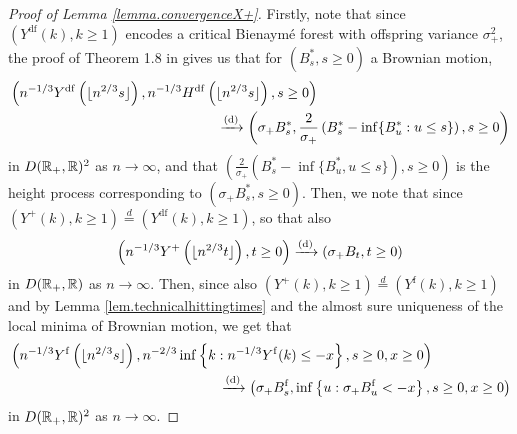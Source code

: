 \begin{proof}[Proof of Lemma \ref{lemma.convergenceX+}]
Firstly, note that since $(Y^{\mathrm{df}}(k),k\geq 1)$ encodes a critical Bienaym\'e forest with offspring variance $\sigma_+^2$, the proof of Theorem 1.8 in \citet{legallRandomTreesApplications2005} gives us that for $(B^*_s,s\geq 0)$ a Brownian motion,
\begin{align}\label{eq.convergenceX}
&\left(n^{-1/3}Y^{\mathrm{df}}\left(\lfloor n^{2/3}s\rfloor \right), n^{-1/3}H^{\mathrm{df}}\left(\lfloor n^{2/3}s\rfloor \right), s\geq 0 \right) \nonumber \\
& \hspace{15em} \todist \left(\sigma_+ B^*_s,\frac{2}{\sigma_+} \left(B^*_s-\inf\{B^*_u:u\leq s\}\right),  s\geq 0\right)
\end{align} 
 in $D({\mathbb R}_+,{\mathbb R})^2$ as $n\to \infty$, and that $\left(\frac{2}{\sigma_+}(B^*_s-\inf\{B^*_u,u\leq s\}),s\geq 0\right)$ is the height process corresponding to $\left(\sigma_+ B^*_s,s \geq 0\right)$. Then, we note that since $(Y^+(k),k\geq 1)\overset{d}{=}(Y^{\mathrm{df}}(k),k\geq 1)$, so that also
 $$\left(n^{-1/3}Y^+\left(\lfloor n^{2/3} t\rfloor \right),t\geq 0\right)\xrightarrow[]{\mathrm{(d)}}\left(\sigma_+ B_t, t\geq 0\right)$$
in $D({\mathbb R}_+,{\mathbb R})$ as $n\to \infty$. Then, since also $(Y^+(k),k\geq 1)\overset{d}{=}(Y^{\mathrm{f}}(k),k\geq 1)$ and by Lemma \ref{lem.technicalhittingtimes} and the almost sure uniqueness of the local minima of Brownian motion, we get that
\begin{align}\begin{split}\label{eq.convergencebychaumont}&\left(n^{-1/3}Y^{\mathrm{f}}\left(\lfloor n^{2/3} s \rfloor \right), n^{-2/3}\inf\left\{k:n^{-1/3}Y^{\mathrm{f}}(k) \leq -x\right\}, s \geq 0, x\geq 0 \right)\\
&\hspace{15em}\todist\left( \sigma_+ B^{\mathrm{f}}_s, \inf\left\{u:\sigma_+ B^{\mathrm{f}}_u < -x\right\}, s\geq 0, x \geq 0\right)\end{split}\end{align}
in $D({\mathbb R}_+,{\mathbb R})^2$ as $n\to \infty$.
 

\end{proof}
